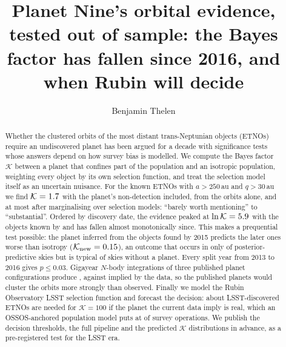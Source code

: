 \documentclass[twocolumn,linenumbers]{aastex631}
\newcommand{\Kbf}{\mathcal{K}}
\begin{document}
\title{Planet Nine's orbital evidence, tested out of sample: the Bayes factor has fallen since 2016, and when Rubin will decide}

\author[0000-0000-0000-0000]{Benjamin Thelen}

\begin{abstract}
Whether the clustered orbits of the most distant trans-Neptunian objects (ETNOs) require an undiscovered planet has been argued for a decade with significance tests whose answers depend on how survey bias is modelled.
We compute the Bayes factor $\Kbf$ between a planet that confines part of the population and an isotropic population, weighting every object by its own selection function, and treat the selection model itself as an uncertain nuisance.
For the \NbbSixteen{} known ETNOs with $a>250$\,au and $q>30$\,au we find $\Kbf=\KbbNondet$ with the planet's non-detection included, \KbbOrbits{} from the orbits alone, and at most \KselMarg{} after marginalising over selection models: ``barely worth mentioning'' to ``substantial''.
Ordered by discovery date, the evidence peaked at $\ln\Kbf=\lnKpeak$ with the objects known by \YearPeak{} and has fallen almost monotonically since.
This makes a prequential test possible: the planet inferred from the \NtrainObjects{} objects found by 2015 predicts the \NnewObjects{} later ones worse than isotropy ($\Kbf_\mathrm{new}=\KnewObjects$), an outcome that occurs in only \PnewUnderPlanet{} of posterior-predictive skies but is typical of skies without a planet. Every split year from 2013 to 2016 gives $p\le0.03$.
Gigayear $N$-body integrations of three published planet configurations produce \NbodySummary, against \DataR{} implied by the data, so the published planets would cluster the orbits more strongly than observed.
Finally we model the Rubin Observatory LSST selection function and forecast the decision: about \NKhundredLSST{} LSST-discovered ETNOs are needed for $\Kbf=100$ if the planet the current data imply is real, which an OSSOS-anchored population model puts at \YieldYears{} of survey operations.
We publish the decision thresholds, the full pipeline and the predicted $\Kbf$ distributions in advance, as a pre-registered test for the LSST era.
\end{abstract}

\end{document}
